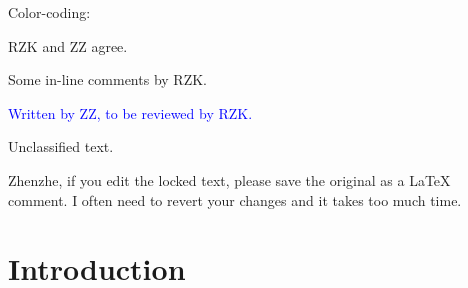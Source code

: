 \documentclass[journal=jacsat,manuscript=article]{achemso}
\newcommand{\lock}{\color{red}}
\newcommand{\lock}{\color{black}}
\newcommand{\comm}{\color{ForestGreen}} %
\begin{document}
\ifdefined\INTERNAL

Color-coding: 

{\lock RZK and ZZ agree.}

{\comm Some in-line comments by RZK.}

\textcolor{blue}{Written by ZZ, to be reviewed by RZK.}

{Unclassified text.}

Zhenzhe, if you edit the locked text, please save the original as a LaTeX comment. I often need to revert your changes and it takes too much time.

\fi

\section{Introduction}



\end{document}
